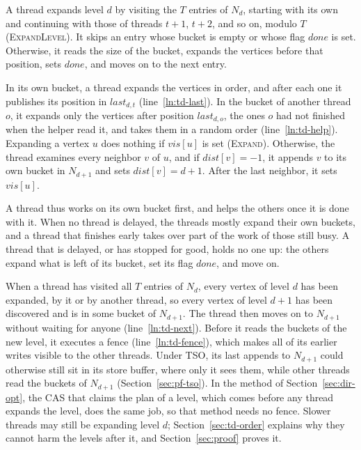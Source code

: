 A thread expands level $d$ by visiting the $T$ entries of $N_d$, starting with its own and continuing with those of threads $t+1$, $t+2$, and so on, modulo $T$ (\textsc{ExpandLevel}). It skips an entry whose bucket is empty or whose flag $\mathit{done}$ is set. Otherwise, it reads the size of the bucket, expands the vertices before that position, sets $\mathit{done}$, and moves on to the next entry.

In its own bucket, a thread expands the vertices in order, and after each one it publishes its position in $\mathit{last}_{d,t}$ (line~\ref{ln:td-last}). In the bucket of another thread $o$, it expands only the vertices after position $\mathit{last}_{d,o}$, the ones $o$ had not finished when the helper read it, and takes them in a random order (line~\ref{ln:td-help}). Expanding a vertex $u$ does nothing if $\mathit{vis}[u]$ is set (\textsc{Expand}). Otherwise, the thread examines every neighbor $v$ of $u$, and if $\mathit{dist}[v] = -1$, it appends $v$ to its own bucket in $N_{d+1}$ and sets $\mathit{dist}[v] = d+1$. After the last neighbor, it sets $\mathit{vis}[u]$.

A thread thus works on its own bucket first, and helps the others once it is done with it. When no thread is delayed, the threads mostly expand their own buckets, and a thread that finishes early takes over part of the work of those still busy. A thread that is delayed, or has stopped for good, holds no one up: the others expand what is left of its bucket, set its flag $\mathit{done}$, and move on.

When a thread has visited all $T$ entries of $N_d$, every vertex of level $d$ has been expanded, by it or by another thread, so every vertex of level $d+1$ has been discovered and is in some bucket of $N_{d+1}$. The thread then moves on to $N_{d+1}$ without waiting for anyone (line~\ref{ln:td-next}). Before it reads the buckets of the new level, it executes a fence (line~\ref{ln:td-fence}), which makes all of its earlier writes visible to the other threads. Under TSO, its last appends to $N_{d+1}$ could otherwise still sit in its store buffer, where only it sees them, while other threads read the buckets of $N_{d+1}$ (Section~\ref{sec:pf-tso}). In the method of Section~\ref{sec:dir-opt}, the CAS that claims the plan of a level, which comes before any thread expands the level, does the same job, so that method needs no fence. Slower threads may still be expanding level $d$; Section~\ref{sec:td-order} explains why they cannot harm the levels after it, and Section~\ref{sec:proof} proves it.

